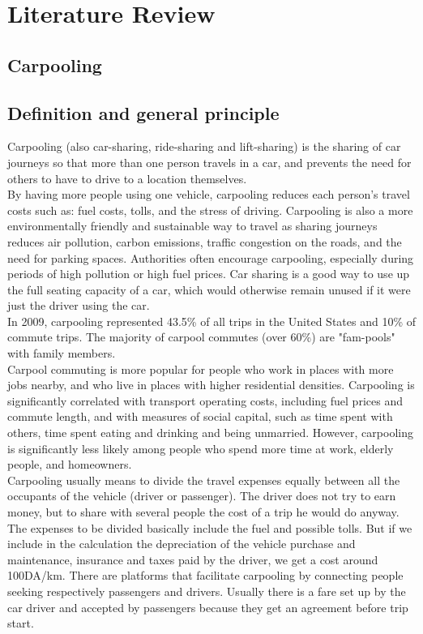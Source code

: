 \chapter{Literature Review} \label{chap:literatureReview}

\section*{Carpooling}

\section{Definition and general principle}
\justify
Carpooling (also car-sharing, ride-sharing and lift-sharing) is the sharing of car journeys so that more than one person travels in a car, and prevents the need for others to have to drive to a location themselves.
\\ By having more people using one vehicle, carpooling reduces each person's travel costs 
such as: fuel costs, tolls, and the stress of driving. Carpooling is also a more environmentally 
friendly and sustainable way to travel as sharing journeys reduces air pollution, carbon 
emissions, traffic congestion on the roads, and the need for parking spaces. Authorities 
often encourage carpooling, especially during periods of high pollution or high fuel prices.
Car sharing is a good way to use up the full seating capacity of a car, which would otherwise 
remain unused if it were just the driver using the car.
\\ In 2009, carpooling represented 43.5\% of all trips in the United States and 10\% of 
commute trips. The majority of carpool commutes (over 60\%) are "fam-pools" with family 
members.
\\ Carpool commuting is more popular for people who work in places with more jobs 
nearby, and who live in places with higher residential densities. Carpooling is significantly 
correlated with transport operating costs, including fuel prices and commute length, and 
with measures of social capital, such as time spent with others, time spent eating and 
drinking and being unmarried. However, carpooling is significantly less likely among 
people who spend more time at work, elderly people, and homeowners. 
\\ Carpooling usually means to divide the travel expenses equally between all the 
occupants of the vehicle (driver or passenger). The driver does not try to earn money, but 
to share with several people the cost of a trip he would do anyway. The expenses to be 
divided basically include the fuel and possible tolls. But if we include in the calculation the 
depreciation of the vehicle purchase and maintenance, insurance and taxes paid by the 
driver, we get a cost around 100DA/km. There are platforms that facilitate carpooling by 
connecting people seeking respectively passengers and drivers. Usually there is a fare set 
up by the car driver and accepted by passengers because they get an agreement before trip 
start.

